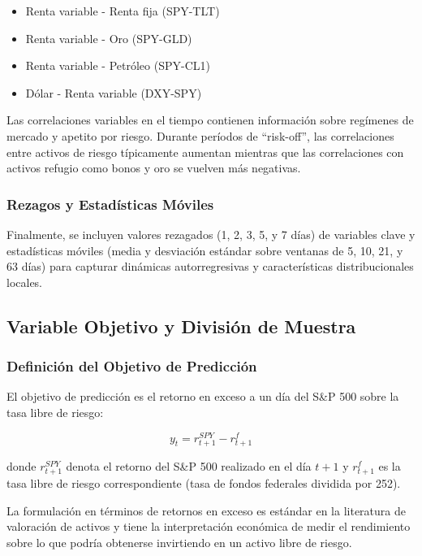 \documentclass[11pt,a4paper]{article}
\begin{document}
\begin{itemize}[noitemsep]
    \item Renta variable - Renta fija (SPY-TLT)
    \item Renta variable - Oro (SPY-GLD)
    \item Renta variable - Petróleo (SPY-CL1)
    \item Dólar - Renta variable (DXY-SPY)
\end{itemize}

Las correlaciones variables en el tiempo contienen información sobre regímenes de mercado y apetito por riesgo. Durante períodos de ``risk-off'', las correlaciones entre activos de riesgo típicamente aumentan mientras que las correlaciones con activos refugio como bonos y oro se vuelven más negativas.

\subsubsection{Rezagos y Estadísticas Móviles}

Finalmente, se incluyen valores rezagados (1, 2, 3, 5, y 7 días) de variables clave y estadísticas móviles (media y desviación estándar sobre ventanas de 5, 10, 21, y 63 días) para capturar dinámicas autorregresivas y características distribucionales locales.

\subsection{Variable Objetivo y División de Muestra}

\subsubsection{Definición del Objetivo de Predicción}

El objetivo de predicción es el retorno en exceso a un día del S\&P 500 sobre la tasa libre de riesgo:

\begin{equation}
y_t = r_{t+1}^{SPY} - r_{t+1}^{f}
\end{equation}

donde $r_{t+1}^{SPY}$ denota el retorno del S\&P 500 realizado en el día $t+1$ y $r_{t+1}^{f}$ es la tasa libre de riesgo correspondiente (tasa de fondos federales dividida por 252).

La formulación en términos de retornos en exceso es estándar en la literatura de valoración de activos y tiene la interpretación económica de medir el rendimiento sobre lo que podría obtenerse invirtiendo en un activo libre de riesgo.
\end{document}
